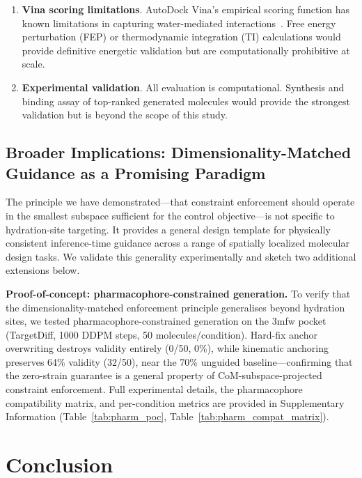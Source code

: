 \documentclass{article}
\begin{document}
\begin{enumerate}[leftmargin=*]
  \item \textbf{Vina scoring limitations}.  AutoDock Vina's empirical
    scoring function has known limitations in capturing water-mediated
    interactions~\cite{trott2010vina}.  Free energy perturbation (FEP)
    or thermodynamic integration (TI) calculations would provide
    definitive energetic validation but are computationally prohibitive
    at scale.

  \item \textbf{Experimental validation}.  All evaluation is computational.
    Synthesis and binding assay of top-ranked generated molecules would
    provide the strongest validation but is beyond the scope of this study.
\end{enumerate}

\subsection{Broader Implications: Dimensionality-Matched Guidance as a Promising Paradigm}

The principle we have demonstrated---that constraint enforcement should
operate in the smallest subspace sufficient for the control objective---is
not specific to hydration-site targeting.  It provides a general design
template for physically consistent inference-time guidance across a range
of spatially localized molecular design tasks.  We validate this generality experimentally and sketch two additional
extensions below.

\vspace{4pt}
\noindent\textbf{Proof-of-concept: pharmacophore-constrained generation.}
To verify that the dimensionality-matched enforcement principle
generalises beyond hydration sites, we tested pharmacophore-constrained
generation on the 3mfw pocket (TargetDiff, 1000 DDPM steps, 50
molecules/condition).  Hard-fix anchor overwriting destroys validity
entirely (0/50, 0\%), while kinematic anchoring preserves 64\% validity
(32/50), near the 70\% unguided baseline---confirming that the
zero-strain guarantee is a general property of CoM-subspace-projected
constraint enforcement.  Full experimental details, the pharmacophore
compatibility matrix, and per-condition metrics are provided in
Supplementary Information (Table~\ref{tab:pharm_poc},
Table~\ref{tab:pharm_compat_matrix}).

\section{Conclusion}
\end{document}
